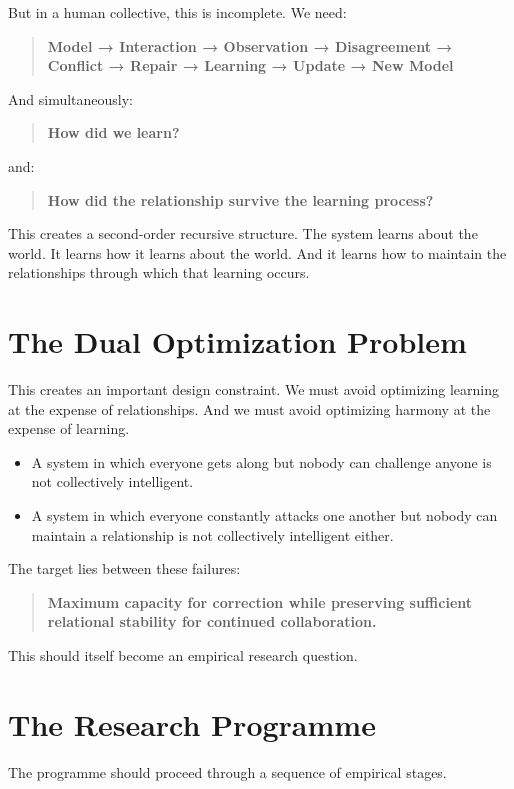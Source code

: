 \documentclass{article}
\begin{document}
But in a human collective, this is incomplete. We need:
\begin{quote}
    \textbf{Model → Interaction → Observation → Disagreement → Conflict → Repair → Learning → Update → New Model}
\end{quote}

And simultaneously:
\begin{quote}
    \textbf{How did we learn?}
\end{quote}
and:
\begin{quote}
    \textbf{How did the relationship survive the learning process?}
\end{quote}

This creates a second-order recursive structure. The system learns about the world. It learns how it learns about the world. And it learns how to maintain the relationships through which that learning occurs.

\section{The Dual Optimization Problem}
This creates an important design constraint. We must avoid optimizing learning at the expense of relationships. And we must avoid optimizing harmony at the expense of learning.

\begin{itemize}
    \item A system in which everyone gets along but nobody can challenge anyone is not collectively intelligent.
    \item A system in which everyone constantly attacks one another but nobody can maintain a relationship is not collectively intelligent either.
\end{itemize}

The target lies between these failures:
\begin{quote}
    \textbf{Maximum capacity for correction while preserving sufficient relational stability for continued collaboration.}
\end{quote}

This should itself become an empirical research question.

\section{The Research Programme}
The programme should proceed through a sequence of empirical stages.
\end{document}
